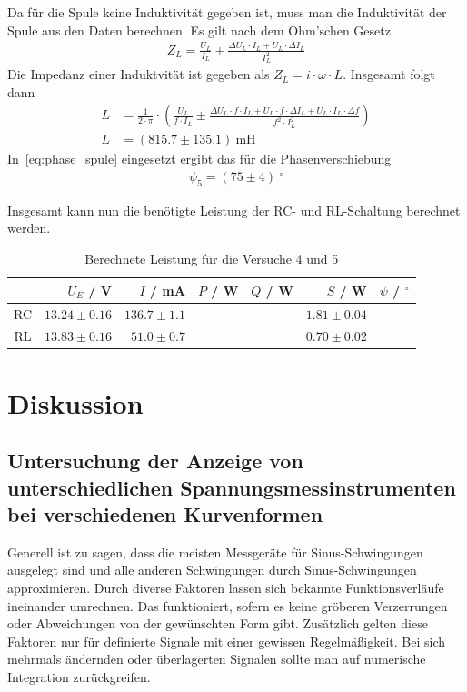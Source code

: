 \documentclass{article}
\begin{document}
Da für die Spule keine Induktivität gegeben ist, muss man die Induktivität der Spule aus den Daten berechnen. Es gilt nach dem Ohm'schen Gesetz
\begin{align*}
Z_L = \frac{U_L}{I_L} \pm \frac{\Delta U_L\cdot I_L + U_L\cdot \Delta I_L}{I_L^2}
\end{align*}
Die Impedanz einer Induktvität ist gegeben als $Z_L = i\cdot \omega \cdot L$. Insgesamt folgt dann
\begin{align*}
L &= \frac{1}{2\cdot \pi}\cdot \left(\frac{U_L}{ f \cdot I_L} \pm \frac{\Delta U_L\cdot f\cdot  I_L + U_L\cdot f\cdot  \Delta I_L + U_L\cdot I_L\cdot \Delta f}{f^2\cdot I_L^2}\right)\\
L &= (815.7 \pm 135.1)~\text{mH}
\end{align*}
In~\eqref{eq:phase_spule} eingesetzt ergibt das für die Phasenverschiebung
\begin{align*}
\psi_5 = (75 \pm 4)~^\circ
\end{align*}


Insgesamt kann nun die benötigte Leistung der RC- und RL-Schaltung berechnet werden.

\begin{table}[H]
\caption{Berechnete Leistung für die Versuche 4 und 5}
\label{tab:task45_leistung_ergebnis}

\begin{tabular}{c|rrrrrr}
& $U_E$ / V & $I$ / mA & $P$ / W & $Q$ / W & $S$ / W & $\psi$ / $^\circ$ \\
\hline 
RC & $13.24\pm0.16$ & $136.7\pm1.1$ &  &  & $1.81\pm 0.04$ &  \\
RL & $13.83\pm0.16$ & $51.0\pm0.7$ &  &  & $0.70 \pm 0.02$ & 
\end{tabular}
\end{table}





\section{Diskussion}


\subsection{Untersuchung  der  Anzeige  von  unterschiedlichen  Spannungsmessinstrumenten  bei verschiedenen Kurvenformen }


Generell ist zu sagen, dass die meisten Messgeräte für Sinus-Schwingungen ausgelegt sind und alle anderen Schwingungen durch Sinus-Schwingungen approximieren. Durch diverse Faktoren lassen sich bekannte Funktionsverläufe ineinander umrechnen. Das funktioniert, sofern es keine gröberen Verzerrungen oder Abweichungen von der gewünschten Form gibt. Zusätzlich gelten diese Faktoren nur für definierte Signale mit einer gewissen Regelmäßigkeit. Bei sich mehrmals ändernden oder überlagerten Signalen sollte man auf numerische Integration zurückgreifen.
\end{document}
